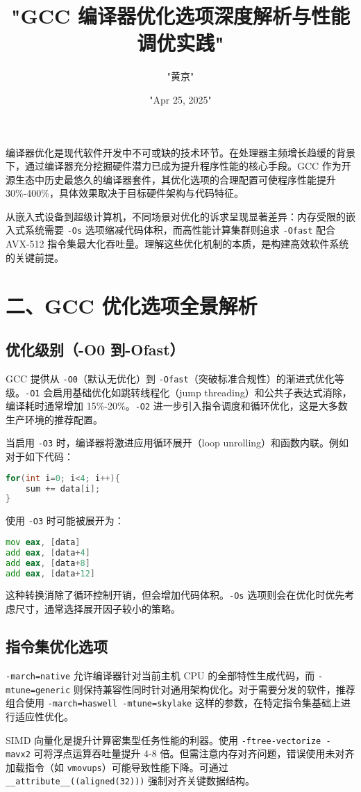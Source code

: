 \title{"GCC 编译器优化选项深度解析与性能调优实践"}
\author{"黄京"}
\date{"Apr 25, 2025"}
\maketitle
编译器优化是现代软件开发中不可或缺的技术环节。在处理器主频增长趋缓的背景下，通过编译器充分挖掘硬件潜力已成为提升程序性能的核心手段。GCC 作为开源生态中历史最悠久的编译器套件，其优化选项的合理配置可使程序性能提升 30\%{}-400\%{}，具体效果取决于目标硬件架构与代码特征。\par
从嵌入式设备到超级计算机，不同场景对优化的诉求呈现显著差异：内存受限的嵌入式系统需要 \verb!-Os! 选项缩减代码体积，而高性能计算集群则追求 \verb!-Ofast! 配合 AVX-512 指令集最大化吞吐量。理解这些优化机制的本质，是构建高效软件系统的关键前提。\par
\chapter{二、GCC 优化选项全景解析}
\section{优化级别（-O0 到-Ofast）}
GCC 提供从 \verb!-O0!（默认无优化）到 \verb!-Ofast!（突破标准合规性）的渐进式优化等级。\verb!-O1! 会启用基础优化如跳转线程化（jump threading）和公共子表达式消除，编译耗时通常增加 15\%{}-20\%{}。\verb!-O2! 进一步引入指令调度和循环优化，这是大多数生产环境的推荐配置。\par
当启用 \verb!-O3! 时，编译器将激进应用循环展开（loop unrolling）和函数内联。例如对于如下代码：\par
\begin{lstlisting}[language=c]
for(int i=0; i<4; i++){
    sum += data[i];
}
\end{lstlisting}
使用 \verb!-O3! 时可能被展开为：\par
\begin{lstlisting}[language=asm]
mov eax, [data]
add eax, [data+4]
add eax, [data+8]
add eax, [data+12]
\end{lstlisting}
这种转换消除了循环控制开销，但会增加代码体积。\verb!-Os! 选项则会在优化时优先考虑尺寸，通常选择展开因子较小的策略。\par
\section{指令集优化选项}
\verb!-march=native! 允许编译器针对当前主机 CPU 的全部特性生成代码，而 \verb!-mtune=generic! 则保持兼容性同时针对通用架构优化。对于需要分发的软件，推荐组合使用 \verb!-march=haswell -mtune=skylake! 这样的参数，在特定指令集基础上进行适应性优化。\par
SIMD 向量化是提升计算密集型任务性能的利器。使用 \verb!-ftree-vectorize -mavx2! 可将浮点运算吞吐量提升 4-8 倍。但需注意内存对齐问题，错误使用未对齐加载指令（如 \verb!vmovups!）可能导致性能下降。可通过 \verb!__attribute__((aligned(32)))! 强制对齐关键数据结构。\par

